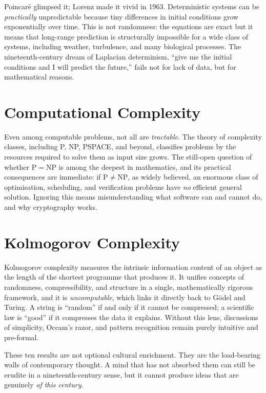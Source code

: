 Poincar\'e glimpsed it; Lorenz made it vivid in 1963. Deterministic systems can be \emph{practically} unpredictable because tiny differences in initial conditions grow exponentially over time. This is not randomness: the equations are exact but it means that long-range prediction is structurally impossible for a wide class of systems, including weather, turbulence, and many biological processes. The nineteenth-century dream of Laplacian determinism, ``give me the initial conditions and I will predict the future,'' fails not for lack of data, but for mathematical reasons.

\section{Computational Complexity}

Even among computable problems, not all are \emph{tractable}. The theory of complexity classes, including P, NP, PSPACE, and beyond, classifies problems by the resources required to solve them as input size grows. The still-open question of whether $\mathrm{P} = \mathrm{NP}$ is among the deepest in mathematics, and its practical consequences are immediate: if $\mathrm{P} \neq \mathrm{NP}$, as widely believed, an enormous class of optimisation, scheduling, and verification problems have \emph{no} efficient general solution. Ignoring this means misunderstanding what software can and cannot do, and why cryptography works.

\section{Kolmogorov Complexity}

Kolmogorov complexity measures the intrinsic information content of an object as the length of the shortest programme that produces it. It unifies concepts of randomness, compressibility, and structure in a single, mathematically rigorous framework, and it is \emph{uncomputable}, which links it directly back to G\"odel and Turing. A string is ``random'' if and only if it cannot be compressed; a scientific law is ``good'' if it compresses the data it explains. Without this lens, discussions of simplicity, Occam's razor, and pattern recognition remain purely intuitive and pre-formal.

These ten results are not optional cultural enrichment. They are the load-bearing walls of contemporary thought. A mind that has not absorbed them can still be erudite in a nineteenth-century sense, but it cannot produce ideas that are genuinely \emph{of this century}.

\endgroup
